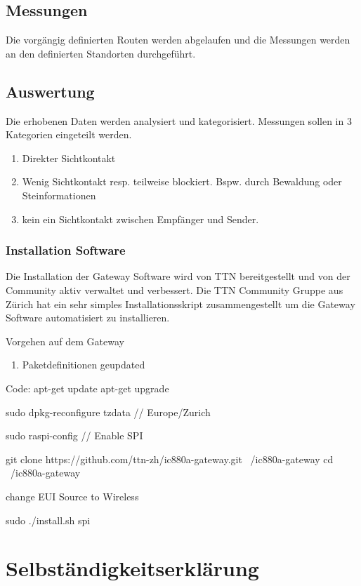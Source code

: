 \documentclass[11pt,english,german]{report}
\theoremstyle{definition}
\begin{document}
\newpage
\section{Messungen}
Die vorgängig definierten Routen werden abgelaufen und die Messungen werden an den definierten Standorten durchgeführt.

\section{Auswertung}
Die erhobenen Daten werden analysiert und kategorisiert. Messungen sollen in 3 Kategorien eingeteilt werden.
\begin{enumerate}
	\item Direkter Sichtkontakt
	\item Wenig Sichtkontakt resp. teilweise blockiert. Bspw. durch Bewaldung oder Steinformationen
	\item kein ein Sichtkontakt zwischen Empfänger und Sender.
\end{enumerate}


\subsection{Installation Software}
Die Installation der Gateway Software wird von TTN bereitgestellt und von der Community aktiv verwaltet und verbessert. Die TTN Community Gruppe aus Zürich hat ein sehr simples Installationsskript zusammengestellt um die Gateway Software automatisiert zu installieren.

Vorgehen auf dem Gateway
\begin{enumerate}
	\item Paketdefinitionen geupdated
	
\end{enumerate}
Code:
apt-get update
apt-get upgrade

sudo dpkg-reconfigure tzdata // Europe/Zurich

sudo raspi-config // Enable SPI

git clone https://github.com/ttn-zh/ic880a-gateway.git ~/ic880a-gateway
cd ~/ic880a-gateway

change EUI Source to Wireless

sudo ./install.sh spi



\chapter*{Selbständigkeitserklärung}
\label{chap:selbstaendigkeitserklaerung}
\end{document}
